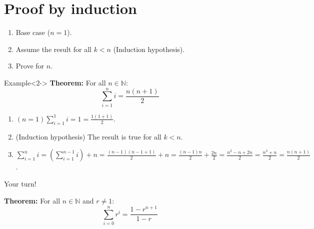 \documentclass[11pt,a4paper,xcolor=dvipsnames, leqno]{beamer}
\begin{document}
\section{Proof by induction}
\begin{frame}
\begin{enumerate}
\item Base case ($n=1$).
\item Assume the result for all $k< n$ (Induction hypothesis).
\item Prove for $n$.
\end{enumerate}
\begin{alertblock}{Example}<2->
\textbf{Theorem:} For all $n\in\mathbb{N}$:
\begin{equation*}
\sum\limits_{i = 1}^n i = \frac{n(n+1)}{2}
\end{equation*}
\begin{enumerate}
\item<3-> $(n=1) \sum\limits_{i = 1}^1 i = 1 = \frac{1(1+1)}{2}$.
\item<4-> (Induction hypothesis) The result is true for all $k<n$.
\item<5-> $\sum\limits_{i = 1}^n i = \left( \sum\limits_{i = 1}^{n-1} i \right)+ n = \frac{(n-1)(n-1 + 1)}{2}+ n = \frac{(n-1)n}{2}+ \frac{2n}{2} = \frac{n^2 -n + 2n}{2} = \frac{n^2 + n}{2} = \frac{n(n+1)}{2}$.
\end{enumerate}
\end{alertblock}
\end{frame}
\begin{frame}{Your turn!}
\begin{block}{}
\textbf{Theorem:} For all $n\in\mathbb{N}$ and $r\neq 1$:
\begin{equation*}
\sum\limits_{i = 0}^n r^i = \frac{1 - r^{n+1}}{1 - r}
\end{equation*}
\end{block}
\end{frame}
\end{document}
